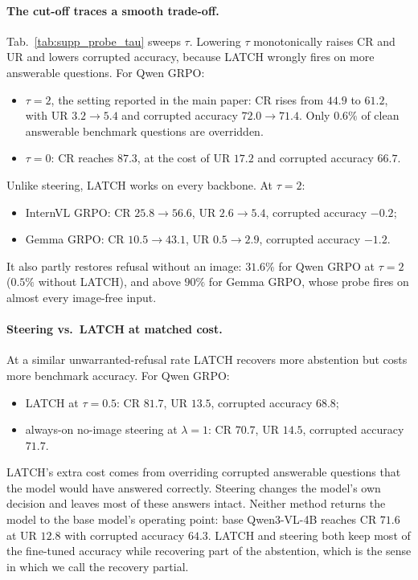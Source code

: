 \paragraph{The cut-off traces a smooth trade-off.}
Tab.~\ref{tab:supp_probe_tau} sweeps $\tau$. Lowering $\tau$ monotonically raises CR and UR
and lowers corrupted accuracy, because LATCH wrongly fires on more answerable questions. For
Qwen GRPO:
\begin{itemize}\itemsep0pt
  \item $\tau{=}2$, the setting reported in the main paper: CR rises from $44.9$ to $61.2$,
        with UR $3.2\rightarrow5.4$ and corrupted accuracy $72.0\rightarrow71.4$. Only
        $0.6\%$ of clean answerable benchmark questions are overridden.
  \item $\tau{=}0$: CR reaches $87.3$, at the cost of UR $17.2$ and corrupted accuracy
        $66.7$.
\end{itemize}
Unlike steering, LATCH works on every backbone. At $\tau{=}2$:
\begin{itemize}\itemsep0pt
  \item InternVL GRPO: CR $25.8\rightarrow56.6$, UR $2.6\rightarrow5.4$, corrupted accuracy
        $-0.2$;
  \item Gemma GRPO: CR $10.5\rightarrow43.1$, UR $0.5\rightarrow2.9$, corrupted accuracy
        $-1.2$.
\end{itemize}
It also partly restores refusal without an image: $31.6\%$ for Qwen GRPO at $\tau{=}2$
($0.5\%$ without LATCH), and above $90\%$ for Gemma GRPO, whose probe fires on almost every
image-free input.

\paragraph{Steering vs.\ LATCH at matched cost.}
At a similar unwarranted-refusal rate LATCH recovers more abstention but costs more
benchmark accuracy. For Qwen GRPO:
\begin{itemize}\itemsep0pt
  \item LATCH at $\tau{=}0.5$: CR $81.7$, UR $13.5$, corrupted accuracy $68.8$;
  \item always-on no-image steering at $\lambda{=}1$: CR $70.7$, UR $14.5$, corrupted
        accuracy $71.7$.
\end{itemize}
LATCH's extra cost comes from overriding corrupted answerable questions that the model
would have answered correctly. Steering changes the model's own decision and leaves most of
these answers intact. Neither method returns the model to the base model's operating point:
base Qwen3-VL-4B reaches CR $71.6$ at UR $12.8$ with corrupted accuracy $64.3$. LATCH and
steering both keep most of the fine-tuned accuracy while recovering part of the abstention,
which is the sense in which we call the recovery partial.

